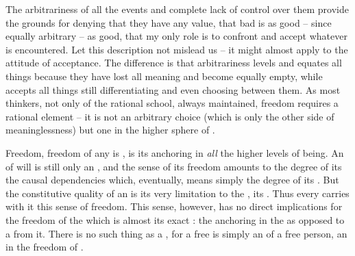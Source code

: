 The arbitrariness of all the events and complete lack of control over them
provide the grounds for denying that they have any value, that bad is as good --
since equally arbitrary -- as good, that my only role is to confront and accept
whatever is encountered. Let this description not mislead us -- it might almost
apply to the attitude of  acceptance. The difference is that
arbitrariness levels and equates all things because they have lost all meaning
and become equally empty, while  accepts all things still
differentiating and even choosing between them. As most thinkers, not only of
the rational school, always maintained, freedom requires a rational element --
it is not an arbitrary choice (which is only the other side of meaninglessness)
but one  in the higher sphere of .

\pa %
Freedom,  freedom of any  is , is its anchoring in
{\em all} the higher levels of being.  An  of will is still only an
, and the sense of its freedom amounts to the degree of its
  the causal dependencies which, eventually, means
simply the degree of its .
But the constitutive quality of an  is its very limitation to the \hoa,
its .  Thus every  carries with it this sense of
freedom. This sense, however, has no direct implications for the freedom of the
 which is almost its exact : the  anchoring
in the  as opposed to a  from it.  There is
no such thing as a , for a free  is simply
an  of a free person, an   in the freedom
of .

